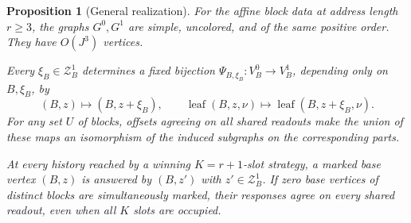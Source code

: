 \documentclass[11pt]{article}
\newtheorem{proposition}[theorem]{Proposition}
\theoremstyle{definition}
\begin{document}
\begin{proposition}[General realization]\label{prop:general-realization}
For the affine block data at address length \(r\ge3\), the graphs
\(G^0,G^1\) are simple, uncolored, and of the same positive order.
They have \(O(J^3)\) vertices.

Every \(\xi_B\in\mathcal Z_B^1\) determines a fixed bijection
\(\Psi_{B,\xi_B}:V_B^0\to V_B^1\), depending only on \(B,\xi_B\),
by
\[
 (B,z)\longmapsto(B,z+\xi_B),\qquad
 \operatorname{leaf}(B,z,\nu)\longmapsto
 \operatorname{leaf}(B,z+\xi_B,\nu).
\]
For any set \(U\) of blocks, offsets agreeing on all shared readouts
make the union of these maps an isomorphism of the induced subgraphs
on the corresponding parts.

At every history reached by a winning \(K=r+1\)-slot strategy,
a marked base vertex \((B,z)\) is answered by \((B,z')\) with
\(z'\in\mathcal Z_B^1\). If zero base vertices of distinct blocks are
simultaneously marked, their responses agree on every shared
readout, even when all \(K\) slots are occupied.
\end{proposition}
\end{document}
